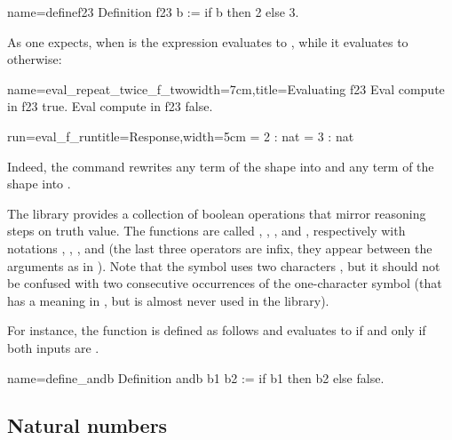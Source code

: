 \begin{coq}{name=definef23}{}
Definition f23 b := if b then 2 else 3.
\end{coq}

As one expects, when  is  the expression
 evaluates to , while it evaluates to  otherwise:

\begin{coq}{name=eval_repeat_twice_f_two}{width=7cm,title=Evaluating f23}
Eval compute in f23 true.
Eval compute in f23 false.
\end{coq}
\begin{coqout}{run=eval_f_run}{title=Response,width=5cm}
  = 2 : nat
  = 3 : nat
\end{coqout}

Indeed, the  command rewrites any term of the shape
 into  and any term of the shape
 into .

The \mcbMC{} library provides a collection of boolean operations that
mirror reasoning steps on truth value.  The functions are called
, ,  , and , respectively with notations
\C{\~\~},  \C{||}, \C{&&}, and \C{==>} (the last three operators are
infix, they appear between the arguments as in ).
  Note that the symbol \C{\~\~} uses two characters \C{\~}, but it should
not be confused with two consecutive occurrences of the one-character symbol
\C{\~} (that has a meaning in \Coq{}, but is almost never used
in the \mcbMC{} library).

For instance, the function  is defined as follows and
evaluates to  if and only if both inputs are .

\begin{coq}{name=define_andb}{}
Definition andb b1 b2 := if b1 then b2 else false.
\end{coq}


\subsection{Natural numbers}
\label{ssec:nat}

